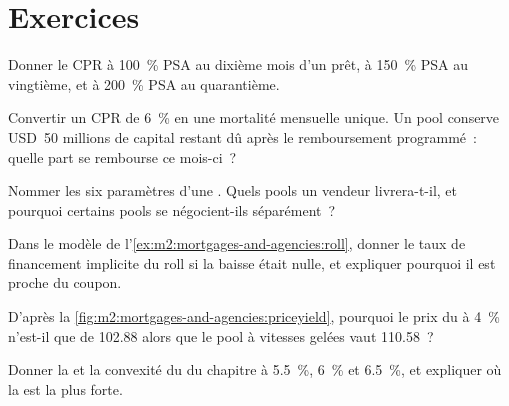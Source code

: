 \section{Exercices}

\begin{exercise}[$\star$]\label{exo:m2:mortgages-and-agencies:1}
Donner le CPR à 100~\% PSA au dixième mois d'un prêt, à 150~\% PSA au
vingtième, et à 200~\% PSA au quarantième.
\end{exercise}

\begin{exercise}[$\star$]\label{exo:m2:mortgages-and-agencies:2}
Convertir un CPR de 6~\% en une mortalité mensuelle unique. Un pool conserve USD~50
millions de capital restant dû après le remboursement programmé~: quelle part se rembourse ce mois-ci~?
\end{exercise}

\begin{exercise}[$\star$]\label{exo:m2:mortgages-and-agencies:3}
Nommer les six paramètres d'une . Quels pools un vendeur livrera-t-il, et
pourquoi certains pools se négocient-ils séparément~?
\end{exercise}

\begin{exercise}[$\star\star$]\label{exo:m2:mortgages-and-agencies:4}
Dans le modèle de l'\cref{ex:m2:mortgages-and-agencies:roll}, donner le
taux de financement implicite du roll si la baisse était nulle, et expliquer
pourquoi il est proche du coupon.
\end{exercise}

\begin{exercise}[$\star\star$]\label{exo:m2:mortgages-and-agencies:5}
D'après la \cref{fig:m2:mortgages-and-agencies:priceyield}, pourquoi le prix du
 à 4~\% n'est-il que de 102.88 alors que le pool à vitesses gelées vaut
110.58~?
\end{exercise}

\begin{exercise}[$\star\star$]\label{exo:m2:mortgages-and-agencies:6}
Donner la  et la convexité du  du chapitre à
5.5~\%, 6~\% et 6.5~\%, et expliquer où la  est la plus forte.
\end{exercise}

